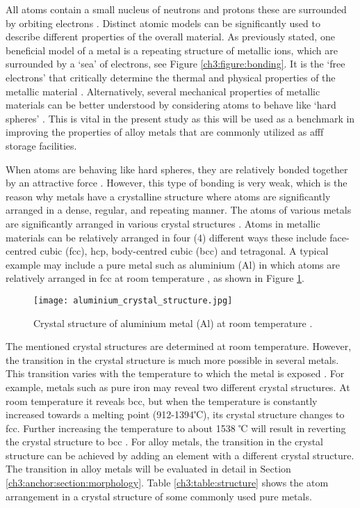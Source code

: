 All atoms contain a small nucleus of neutrons and protons these are surrounded by orbiting electrons \cite{hench2005biomaterials}. Distinct atomic models can be significantly used to describe different properties of the overall material. As previously stated, one beneficial model of a metal is a repeating structure of metallic ions, which are surrounded by a ‘sea’ of electrons, see Figure \ref{ch3:figure:bonding}. It is the ‘free electrons’ that critically determine the thermal and physical properties of the metallic material \cite{hench2005biomaterials}. Alternatively, several mechanical properties of metallic materials can be better understood by considering atoms to behave like ‘hard spheres’ \cite{hench2005biomaterials}. This is vital in the present study as this will be used as a benchmark in improving the properties of alloy metals that are commonly utilized as \acrshort{afff} storage facilities.

When atoms are behaving like hard spheres, they are relatively bonded together by an attractive force \cite{lepetit2017topological}. However, this type of bonding is very weak, which is the reason why metals have a crystalline structure where atoms are significantly arranged in a dense, regular, and repeating manner. The atoms of various metals are significantly arranged in various crystal structures \cite{hench2005biomaterials}. Atoms in metallic materials can be relatively arranged in four (4) different ways these include face-centred cubic (\acrshort{fcc}), \acrfull{hcp}, body-centred cubic (\acrshort{bcc}) and tetragonal. A typical example may include a pure metal such as aluminium (Al) in which atoms are relatively arranged in \acrshort{fcc} at room temperature \cite{hench2005biomaterials}, as shown in Figure \ref{ch3:figure:aluminium}.
 
\begin{figure}[H]
    \centering
    \texttt{[image: aluminium\_crystal\_structure.jpg]}
    \caption{Crystal structure of aluminium metal (Al) at room temperature \cite{hench2005biomaterials}.}
    \label{ch3:figure:aluminium}
\end{figure}

The mentioned crystal structures are determined at room temperature.  However, the transition in the crystal structure is much more possible in several metals. This transition varies with the temperature to which the metal is exposed \cite{callister2018materials}. For example, metals such as pure iron may reveal two different crystal structures. At room temperature it reveals \acrshort{bcc}, but when the temperature is constantly increased towards a melting point (912-1394℃), its crystal structure changes to \acrshort{fcc}. Further increasing the temperature to about 1538 ℃ will result in reverting the crystal structure to \acrshort{bcc} \cite{ali2020empirical, molabe2018determining}. For alloy metals, the transition in the crystal structure can be achieved by adding an element with a different crystal structure. The transition in alloy metals will be evaluated in detail in Section \ref{ch3:anchor:section:morphology}. Table \ref{ch3:table:structure} shows the atom arrangement in a crystal structure of some commonly used pure metals.

